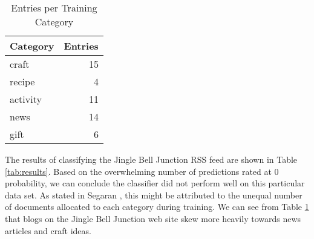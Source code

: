 \documentclass[letterpaper,11pt]{report}
\begin{document}
\begin{savenotes}
\begin{table}[htbp]
	\centering
    \begin{tabular}{|p{4cm}|r|}
    \hline
    Category & Entries \\ \hline
    craft    & 15    \\ \hline
    recipe   & 4     \\ \hline
    activity & 11    \\ \hline
    news     & 14    \\ \hline
    gift     & 6     \\ \hline
    \end{tabular}
    \caption {Entries per Training Category}
			\label{tab:training}
\end{table}

The results of classifying the Jingle Bell Junction RSS feed are shown in Table \ref{tab:results}. Based on the overwhelming number of predictions rated at 0 probability, we can conclude the classifier did not perform well on this particular data set. As stated in Segaran \cite{segaran2007programming}, this might be attributed to the unequal number of documents allocated to each category during training. We can see from Table \ref{tab:training} that blogs on the Jingle Bell Junction web site skew more heavily towards news articles and craft ideas.


\end{savenotes}
\end{document}
